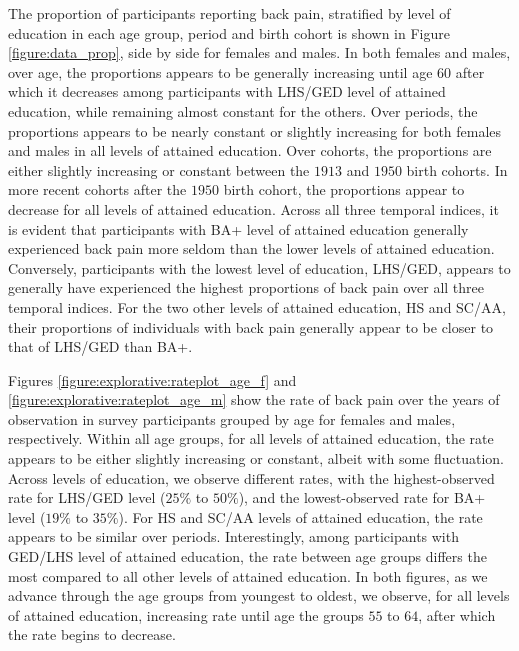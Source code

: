 The proportion of participants reporting back pain, stratified by level of education in each age group, period and birth cohort is shown in Figure \ref{figure:data_prop}, side by side for females and males. In both females and males, over age, the proportions appears to be generally increasing until age $60$ after which it decreases among participants with LHS/GED level of attained education, while remaining almost constant for the others. Over periods, the proportions appears to be nearly constant or slightly increasing for both females and males in all levels of attained education. Over cohorts, the proportions are either slightly increasing or constant between the $1913$ and $1950$ birth cohorts. In more recent cohorts after the $1950$ birth cohort, the proportions appear to decrease for all levels of attained education. Across all three temporal indices, it is evident that participants with BA+ level of attained education generally experienced back pain more seldom than the lower levels of attained education. Conversely, participants with the lowest level of education, LHS/GED, appears to generally have experienced the highest proportions of back pain over all three temporal indices. For the two other levels of attained education, HS and SC/AA, their proportions of individuals with back pain generally appear to be closer to that of LHS/GED than BA+. 

Figures \ref{figure:explorative:rateplot_age_f} and \ref{figure:explorative:rateplot_age_m} show the rate of back pain over the years of observation in survey participants grouped by age for females and males, respectively. Within all age groups, for all levels of attained education, the rate appears to be either slightly increasing or constant, albeit with some fluctuation. Across levels of education, we observe different rates, with the highest-observed rate for LHS/GED level ($25\%$ to $50\%$), and the lowest-observed rate for BA+ level ($19\%$ to $35\%$). For HS and SC/AA levels of attained education, the rate appears to be similar over periods. Interestingly, among participants with GED/LHS level of attained education, the rate between age groups differs the most compared to all other levels of attained education. In both figures, as we advance through the age groups from youngest to oldest, we observe, for all levels of attained education, increasing rate until age the groups $55$ to $64$, after which the rate begins to decrease. 


